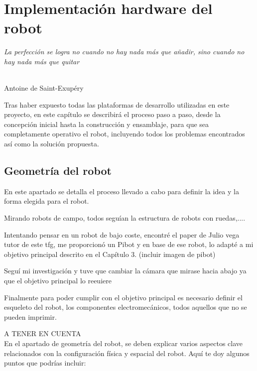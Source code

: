\chapter{Implementación hardware del robot}
\label{cap:capitulo5}

\begin{flushright}
\begin{minipage}[]{10cm}
\emph{La perfección se logra no cuando no hay nada más que añadir, sino cuando no hay nada más que quitar}\\
\end{minipage}\\

Antoine de Saint-Exupéry\\
\end{flushright}

\vspace{1cm}

Tras haber expuesto todas las plataformas de desarrollo utilizadas en este proyecto, en este capítulo se describirá el proceso paso a paso, desde la concepción inicial hasta la construcción y ensamblaje, para que sea completamente operativo el robot, incluyendo todos los problemas encontrados así como la solución propuesta.

\section{Geometría del robot}

En este apartado se detalla el proceso llevado a cabo para definir la idea y la forma elegida para el robot.

Mirando robots de campo, todos seguían la estructura de robots con ruedas,.... 

Intentando pensar en un robot de bajo coste, encontré el paper de Julio vega tutor de este tfg, me proporcionó un Pibot y en base de ese robot, lo adapté a mi objetivo principal descrito en el Capítulo 3.
(incluir imagen de pibot)

Seguí mi investigación y tuve que cambiar la cámara que mirase hacia abajo ya que el objetivo principal lo reeuiere 

Finalmente para poder cumplir con el objetivo principal es necesario definir el esqueleto del robot, los componentes electromecánicos, todos aquellos que no se pueden imprimir. 


A TENER EN CUENTA\\

En el apartado de geometría del robot, se deben explicar varios aspectos clave relacionados con la configuración física y espacial del robot. Aquí te doy algunos puntos que podrías incluir:

